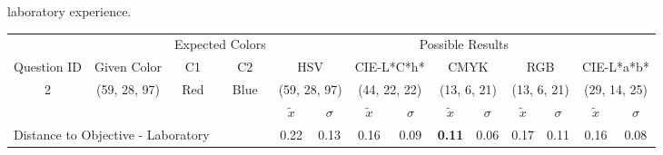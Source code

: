 laboratory experience. \par
%
\begin{table}[H]
  \resizebox{\textwidth}{!} {
  \begin{tabular}{lccccccccccccc}
    \hline
    \multicolumn{1}{c}{}                              &                                      & \multicolumn{2}{c}{Expected Colors}                   & \multicolumn{10}{c}{Possible Results}                                                                                                                                                                                                                                                                                        \\ \cline{3-14}
    \multicolumn{1}{c}{\multirow{-2}{*}{Question ID}} & \multirow{-2}{*}{Given Color}        & C1                       & C2                         & \multicolumn{2}{c}{HSV}                                        & \multicolumn{2}{c}{CIE-L*C*h*}                                 & \multicolumn{2}{c}{CMYK}                                       & \multicolumn{2}{c}{RGB}                                        & \multicolumn{2}{c}{CIE-L*a*b*}                                 \\ \hline
    \multicolumn{1}{c}{2}                             & \cellcolor[HTML]{FF00FF}(59, 28, 97) & \multicolumn{1}{c|}{Red} & \multicolumn{1}{c|}{Blue}  & \multicolumn{2}{c|}{\cellcolor[HTML]{FF00FF}(59, 28, 97)}      & \multicolumn{2}{c|}{\cellcolor[HTML]{FB0080}(44, 22, 22)}       & \multicolumn{2}{c|}{\cellcolor[HTML]{800080}(13, 6, 21)}       & \multicolumn{2}{c|}{\cellcolor[HTML]{800080}(13, 6, 21)}       & \multicolumn{2}{c|}{\cellcolor[HTML]{CA0088}(29, 14, 25)}       \\ \hline
                                                      & \multicolumn{1}{l}{}                 & \multicolumn{1}{l}{}     & \multicolumn{1}{l}{}       & \multicolumn{1}{c}{$\tilde{x}$} & \multicolumn{1}{c}{$\sigma$} & \multicolumn{1}{c}{$\tilde{x}$} & \multicolumn{1}{c}{$\sigma$} & \multicolumn{1}{c}{$\tilde{x}$} & \multicolumn{1}{c}{$\sigma$} & \multicolumn{1}{c}{$\tilde{x}$} & \multicolumn{1}{c}{$\sigma$} & \multicolumn{1}{c}{$\tilde{x}$} & \multicolumn{1}{c}{$\sigma$} \\ \hline
    \multicolumn{4}{l}{Distance to Objective - Laboratory}                                                                                           & \multicolumn{1}{|c}{0.22}       & \multicolumn{1}{c|}{0.13}    & \multicolumn{1}{|c}{0.16}       & \multicolumn{1}{c|}{0.09}    & \multicolumn{1}{|c}{\textbf{0.11}}       & \multicolumn{1}{c|}{0.06}    & \multicolumn{1}{|c}{0.17}       & \multicolumn{1}{c|}{0.11}    & \multicolumn{1}{|c}{0.16}       & \multicolumn{1}{c|}{0.08}    \\

\end{tabular}}
\end{table}
